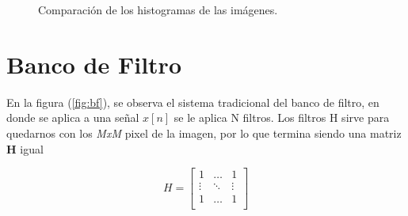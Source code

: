 \begin{figure}[H]
	\centering
	\caption{Comparación de los histogramas de las imágenes\label{fig:kernelhist}.}
\end{figure}	

\section{Banco de Filtro}

En la figura (\ref{fig:bf}), se observa el sistema tradicional del banco de filtro, en donde se aplica a una señal $x[n]$ se le aplica N filtros. Los filtros H sirve para quedarnos con los \textit{MxM} pixel de la imagen, por lo que termina siendo una matriz \textbf{H} igual

\begin{equation}
H=\begin{bmatrix}
1&\ldots&1\\
\vdots&\ddots&\vdots\\
1&\ldots&1\\
\end{bmatrix}
\end{equation}

